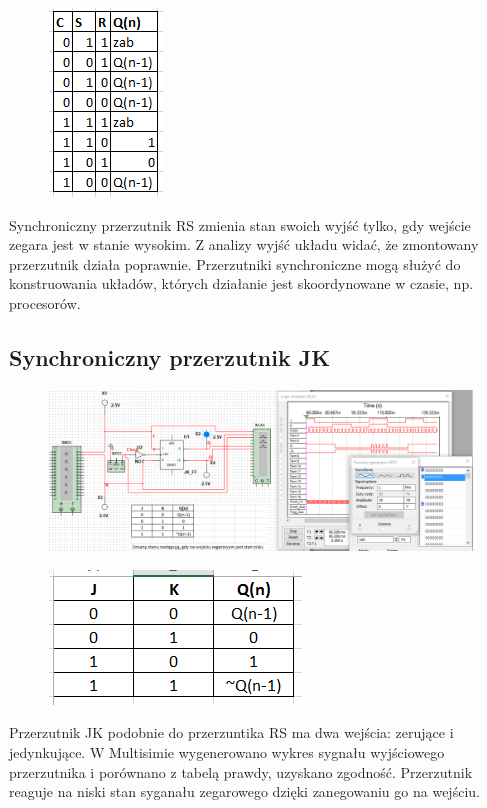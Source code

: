 \documentclass[12pt,a4paper]{article}
\begin{document}
\begin{figure}[H]
\centering
\includegraphics{img/3bTruthTable}
\end{figure}

Synchroniczny przerzutnik RS zmienia stan swoich wyjść tylko, gdy wejście zegara jest w stanie wysokim. Z analizy wyjść układu widać, że zmontowany przerzutnik działa poprawnie. Przerzutniki synchroniczne mogą służyć do konstruowania układów, których działanie jest skoordynowane w czasie, np. procesorów.

\subsection{Synchroniczny przerzutnik JK}
\begin{figure}[H]
\centering
\includegraphics[width=\textwidth]{img/3c_syncJK}
\end{figure}

\begin{figure}[H]
\centering
\includegraphics{img/3cTruthTable}
\end{figure}

Przerzutnik JK podobnie do przerzuntika RS ma dwa wejścia: zerujące i jedynkujące. W Multisimie wygenerowano wykres sygnału wyjściowego przerzutnika i porównano z tabelą prawdy, uzyskano zgodność. Przerzutnik reaguje na niski stan syganału zegarowego dzięki zanegowaniu go na wejściu.
\end{document}
